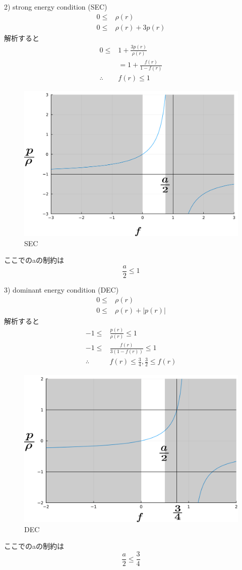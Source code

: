 \documentclass[dvipdfmx]{report} %
\begin{document}
2) strong energy condition (SEC)
\begin{equation*}
\begin{split}
	0 \leq & \rho(r)\\
	0 \leq & \rho(r) + 3p(r)
\end{split}
\end{equation*}
解析すると
\begin{equation*}
\begin{split}
	0 \leq & 1 + \frac{ 3p(r) }{ \rho(r) }\\
	&= 1 + \frac{ f(r) }{ 1 - f(r) }\\
	\therefore & f(r) \leq 1
\end{split}
\end{equation*}
\begin{figure}[H]
\centering
\includegraphics[width=0.5\columnwidth]{./images/sec.png}
\caption{SEC}
\label{}
\end{figure}
ここでのaの制約は
\[ \frac{a}{2} \leq 1 \]

3) dominant energy condition (DEC)
\begin{equation*}
\begin{split}
	0 \leq & \rho(r)\\
	0 \leq & \rho(r) + |p(r)|
\end{split}
\end{equation*}
解析すると
\begin{equation*}
\begin{split}
	-1 \leq & \frac{ p(r) }{ \rho(r) } \leq 1\\
	-1 \leq & \frac{ f(r) }{ 3 (1 - f(r) ) } \leq 1\\
	\therefore & f(r) \leq \frac{3}{4}, \frac{3}{2} \leq f(r)
\end{split}
\end{equation*}
\begin{figure}[H]
\centering
\includegraphics[width=0.5\columnwidth]{./images/dec.png}
\caption{DEC}
\label{}
\end{figure}
ここでのaの制約は
\[ \frac{a}{2} \leq \frac{3}{4} \]
\end{document}
